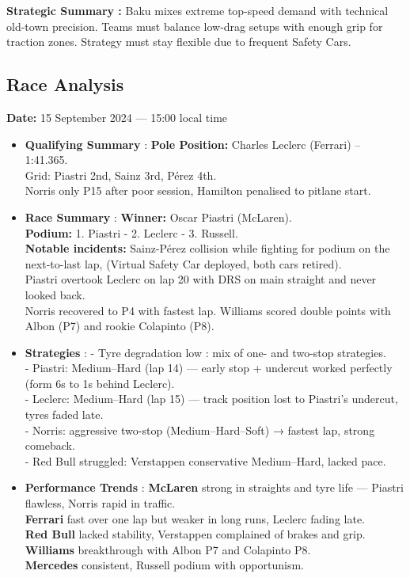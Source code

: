 \textbf{Strategic Summary :} Baku mixes extreme top-speed demand with technical old-town precision. Teams must balance low-drag setups with enough grip for traction zones. Strategy must stay flexible due to frequent Safety Cars.

\subsection{Race Analysis}

\textbf{Date:} 15 September 2024 — 15:00 local time

\begin{itemize}
    \item \textbf{Qualifying Summary} : \textbf{Pole Position:} Charles Leclerc (Ferrari) – 1:41.365. \\
    Grid: Piastri 2nd, Sainz 3rd, Pérez 4th. \\
    Norris only P15 after poor session, Hamilton penalised to pitlane start.

    \item \textbf{Race Summary} : \textbf{Winner:} Oscar Piastri (McLaren). \\
    \textbf{Podium:} 1. Piastri - 2. Leclerc - 3. Russell. \\
    \textbf{Notable incidents:} Sainz-Pérez collision while fighting for podium on the next-to-last lap, (Virtual Safety Car deployed, both cars retired). \\
    Piastri overtook Leclerc on lap 20 with DRS on main straight and never looked back. \\
    Norris recovered to P4 with fastest lap. Williams scored double points with Albon (P7) and rookie Colapinto (P8).

    \item \textbf{Strategies} : 
    - Tyre degradation low : mix of one- and two-stop strategies. \\
    - Piastri: Medium–Hard (lap 14) — early stop + undercut worked perfectly (form 6s to 1s behind Leclerc). \\
    - Leclerc: Medium–Hard (lap 15) — track position lost to Piastri’s undercut, tyres faded late. \\
    - Norris: aggressive two-stop (Medium–Hard–Soft) → fastest lap, strong comeback. \\
    - Red Bull struggled: Verstappen conservative Medium–Hard, lacked pace.

    \item \textbf{Performance Trends} : \textbf{McLaren} strong in straights and tyre life — Piastri flawless, Norris rapid in traffic. \\
    \textbf{Ferrari} fast over one lap but weaker in long runs, Leclerc fading late. \\
    \textbf{Red Bull} lacked stability, Verstappen complained of brakes and grip. \\
    \textbf{Williams} breakthrough with Albon P7 and Colapinto P8. \\
    \textbf{Mercedes} consistent, Russell podium with opportunism.


\end{itemize}
